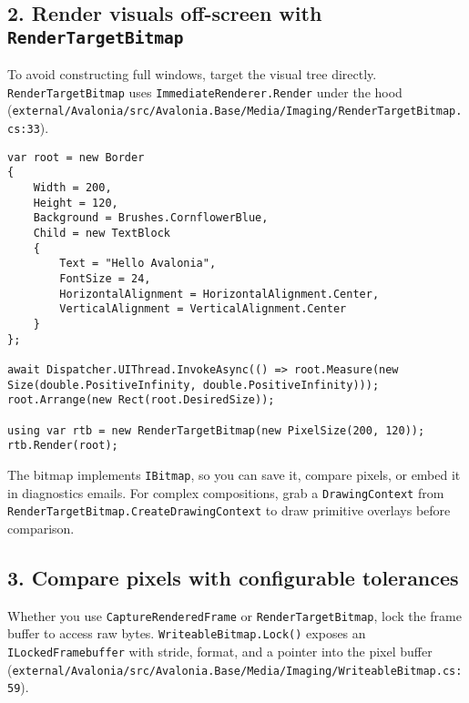 \subsection{\texorpdfstring{2. Render visuals off-screen with
\texttt{RenderTargetBitmap}}{2. Render visuals off-screen with RenderTargetBitmap}}\label{render-visuals-off-screen-with-rendertargetbitmap}

To avoid constructing full windows, target the visual tree directly.
\passthrough{\lstinline!RenderTargetBitmap!} uses
\passthrough{\lstinline!ImmediateRenderer.Render!} under the hood
(\passthrough{\lstinline!external/Avalonia/src/Avalonia.Base/Media/Imaging/RenderTargetBitmap.cs:33!}).

\begin{lstlisting}
var root = new Border
{
    Width = 200,
    Height = 120,
    Background = Brushes.CornflowerBlue,
    Child = new TextBlock
    {
        Text = "Hello Avalonia",
        FontSize = 24,
        HorizontalAlignment = HorizontalAlignment.Center,
        VerticalAlignment = VerticalAlignment.Center
    }
};

await Dispatcher.UIThread.InvokeAsync(() => root.Measure(new Size(double.PositiveInfinity, double.PositiveInfinity)));
root.Arrange(new Rect(root.DesiredSize));

using var rtb = new RenderTargetBitmap(new PixelSize(200, 120));
rtb.Render(root);
\end{lstlisting}

The bitmap implements \passthrough{\lstinline!IBitmap!}, so you can save
it, compare pixels, or embed it in diagnostics emails. For complex
compositions, grab a \passthrough{\lstinline!DrawingContext!} from
\passthrough{\lstinline!RenderTargetBitmap.CreateDrawingContext!} to
draw primitive overlays before comparison.

\subsection{3. Compare pixels with configurable
tolerances}\label{compare-pixels-with-configurable-tolerances}

Whether you use \passthrough{\lstinline!CaptureRenderedFrame!} or
\passthrough{\lstinline!RenderTargetBitmap!}, lock the frame buffer to
access raw bytes. \passthrough{\lstinline!WriteableBitmap.Lock()!}
exposes an \passthrough{\lstinline!ILockedFramebuffer!} with stride,
format, and a pointer into the pixel buffer
(\passthrough{\lstinline!external/Avalonia/src/Avalonia.Base/Media/Imaging/WriteableBitmap.cs:59!}).

